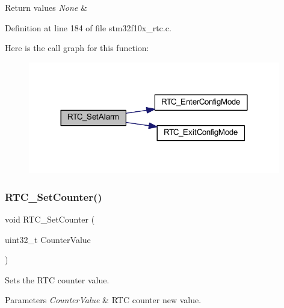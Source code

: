 \begin{DoxyRetVals}{Return values}
{\em None} & \\
\hline
\end{DoxyRetVals}


Definition at line 184 of file stm32f10x\+\_\+rtc.\+c.

Here is the call graph for this function\+:
\nopagebreak
\begin{figure}[H]
\begin{center}
\leavevmode
\includegraphics[width=312pt]{group___r_t_c___exported___functions_gaec644c636a30ab5e287ba60ffc77132c_cgraph}
\end{center}
\end{figure}
\mbox{\label{group___r_t_c___exported___functions_gafa81ec17158de1d1a7740eca81b9fb65}} 
\subsubsection{\texorpdfstring{R\+T\+C\+\_\+\+Set\+Counter()}{RTC\_SetCounter()}}
{\footnotesize\ttfamily void R\+T\+C\+\_\+\+Set\+Counter (\begin{DoxyParamCaption}\item[{uint32\+\_\+t}]{Counter\+Value }\end{DoxyParamCaption})}



Sets the R\+TC counter value. 


\begin{DoxyParams}{Parameters}
{\em Counter\+Value} & R\+TC counter new value. \\
\hline
\end{DoxyParams}

